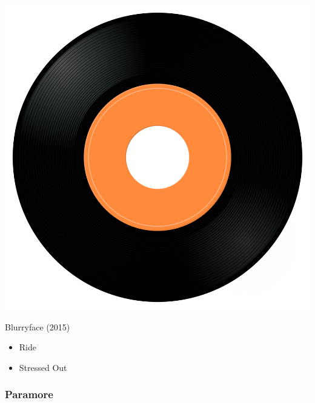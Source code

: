 \begin{minipage}[t]{0.25\textwidth}\vspace{0pt}
\captionsetup{type=figure}
\includegraphics[width=\textwidth]{Images/cover.png}
\caption*{Blurryface (2015)}
\end{minipage}
\begin{minipage}[t]{0.25\textwidth}\vspace{0pt}
\begin{itemize}[nosep,leftmargin=1em,labelwidth=*,align=left]
	\setlength{\itemsep}{0pt}
	\item Ride
	\item Stressed Out
\end{itemize}
\end{minipage}

\subsubsection{Paramore}

